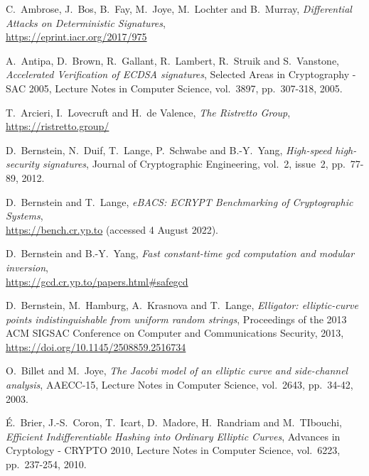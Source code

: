 \documentclass{llncs}
\begin{document}
\begin{thebibliography}{20}

\RaggedRight

C.~Ambrose, J.~Bos, B.~Fay, M.~Joye, M.~Lochter and B.~Murray,
\emph{Differential Attacks on Deterministic Signatures},\\
\url{https://eprint.iacr.org/2017/975}

A.~Antipa, D.~Brown, R.~Gallant, R.~Lambert, R.~Struik and S.~Vanstone,
\emph{Accelerated Verification of ECDSA signatures},
Selected Areas in Cryptography - SAC 2005, Lecture Notes in Computer
Science, vol.~3897, pp.~307-318, 2005.

T.~Arcieri, I.~Lovecruft and H.~de Valence,
\emph{The Ristretto Group},\\
\url{https://ristretto.group/}

D.~Bernstein, N.~Duif, T.~Lange, P.~Schwabe and B.-Y.~Yang,
\emph{High-speed high-security signatures},
Journal of Cryptographic Engineering, vol.~2, issue~2, pp.~77-89, 2012.

D.~Bernstein and T.~Lange,
\emph{eBACS: ECRYPT Benchmarking of Cryptographic Systems},\\
\url{https://bench.cr.yp.to} (accessed 4 August 2022).

D.~Bernstein and B.-Y.~Yang,
\emph{Fast constant-time gcd computation and modular inversion},\\
\url{https://gcd.cr.yp.to/papers.html#safegcd}

D.~Bernstein, M.~Hamburg, A.~Krasnova and T.~Lange,
\emph{Elligator: elliptic-curve points indistinguishable from uniform
random strings},
Proceedings of the 2013 ACM SIGSAC Conference on Computer and Communications
Security, 2013,\\
\url{https://doi.org/10.1145/2508859.2516734}

O.~Billet and M.~Joye,
\emph{The Jacobi model of an elliptic curve and side-channel analysis},
AAECC-15, Lecture Notes in Computer Science, vol.~2643, pp.~34-42, 2003.

É.~Brier, J.-S.~Coron, T.~Icart, D.~Madore, H.~Randriam and M.~TIbouchi,
\emph{Efficient Indifferentiable Hashing into Ordinary Elliptic Curves},
Advances in Cryptology - CRYPTO 2010, Lecture Notes in Computer Science,
vol.~6223, pp.~237-254, 2010.


\end{thebibliography}
\end{document}
